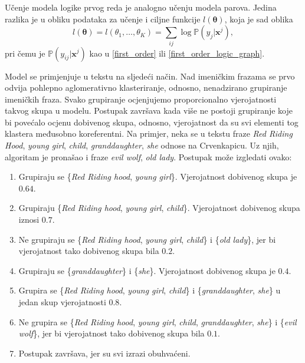 \documentclass[a4paper,twoside,12pt]{memoir} %
\newcommand{\ti}[1]{\textit{#1\/}}
\newcommand{\tb}{\textbf}
\begin{document}
	\bigskip

	Učenje modela logike prvog reda je analogno učenju modela parova. Jedina razlika je u obliku podataka za učenje i ciljne funkcije $l(\bm{\theta})$, koja je sad oblika
	\begin{equation*}
	l(\bm{\theta}) = l(\theta_1, \ldots, \theta_K) = \sum_{ij} \log \mathbb{P} (y_{j} | \mathbf{x}^j),
	\end{equation*}
	pri čemu je $\mathbb{P}(y_{ij} | \mathbf{x}^j)$ kao u \eqref{first_order} ili \eqref{first_order_logic_graph}.

	\bigskip

	Model se primjenjuje u tekstu na sljedeći način. Nad imeničkim frazama se prvo odvija pohlepno aglomerativno klasteriranje, odnosno, nenadzirano grupiranje imeničkih fraza. Svako grupiranje ocjenjujemo proporcionalno vjerojatnosti takvog skupa u modelu. Postupak završava kada više ne postoji grupiranje koje bi povećalo ocjenu dobivenog skupa, odnosno, vjerojatnost da su svi elementi tog klastera međusobno koreferentni. Na primjer, neka se u tekstu fraze \ti{Red Riding Hood}, \ti{young girl}, \ti{child}, \ti{granddaughter}, \ti{she} odnose na Crvenkapicu. Uz njih, algoritam je pronašao i fraze \ti{evil wolf}, \ti{old lady}. Postupak može izgledati ovako:

	\begin{enumerate}[label=\tb{\arabic*:}, align=left, labelwidth=13pt]
		\item	Grupiraju se \{\ti{Red Riding hood}, \ti{young girl}\}. Vjerojatnost dobivenog skupa je $0.64$.
		\item	Grupiraju \{\ti{Red Riding hood}, \ti{young girl}, \ti{child}\}. Vjerojatnost dobivenog skupa iznosi $0.7$.
		\item	Ne grupiraju se \{\ti{Red Riding hood}, \ti{young girl}, \ti{child}\} i \{\ti{old lady}\}, jer bi vjerojatnost tako dobivenog skupa bila $0.2$.
		\item	Grupiraju se  \{\ti{granddaughter}\} i  \{\ti{she}\}. Vjerojatnost dobivenog skupa je $0.4$.
		\item	Grupira se \{\ti{Red Riding hood}, \ti{young girl}, \ti{child}\} i \{\ti{granddaughter}, \ti{she}\} u jedan skup vjerojatnosti $0.8$.
		\item	Ne grupira se \{\ti{Red Riding hood}, \ti{young girl}, \ti{child}, \ti{granddaughter}, \ti{she}\} i \{\ti{evil wolf}\}, jer bi vjerojatnost tako dobivenog skupa bila $0.1$.
		\item	Postupak završava, jer su svi izrazi obuhvaćeni.
	\end{enumerate}
\end{document}
